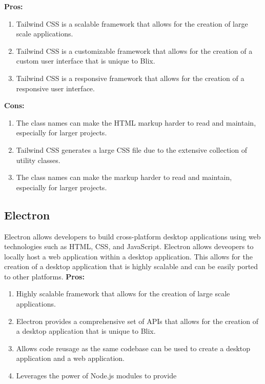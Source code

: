 \documentclass[11pt,a4paper]{article}
\begin{document}
\textbf{Pros:}
\begin{enumerate}[label*=\arabic*.]
	\item[\textbullet] Tailwind CSS is a scalable framework that allows for the creation of large scale applications.
	\item[\textbullet] Tailwind CSS is a customizable framework that allows for the creation of a custom user interface that is unique to Blix.
	\item[\textbullet] Tailwind CSS is a responsive framework that allows for the creation of a responsive user interface.
\end{enumerate}

\textbf{Cons:}
\begin{enumerate}[label*=\arabic*.]
	\item[\textbullet] The class names can make the HTML markup harder to read and maintain, especially for larger projects.
	\item[\textbullet] Tailwind CSS generates a large CSS file due to the extensive collection of utility classes. 
	\item[\textbullet] The class names can make the markup harder to read and maintain, especially for larger projects.
\end{enumerate}

\subsection{Electron}

Electron allows developers to build cross-platform desktop applications using web technologies such as HTML, CSS, and JavaScript.
Electron allows deveopers to locally host a web application within a desktop application. 
This allows for the creation of a desktop application that is highly scalable and can be easily ported to other platforms.
\textbf{Pros:}

\begin{enumerate}[label*=\arabic*.]
	\item[\textbullet] Highly scalable framework that allows for the creation of large scale applications.
	\item[\textbullet] Electron provides a comprehensive set of APIs that allows for the creation of a desktop application that is unique to Blix.
	\item[\textbullet] Allows code reusage as the same codebase can be used to create a desktop application and a web application.
	\item[\textbullet] Leverages the power of Node.js modules to provide 
\end{enumerate}
\end{document}

